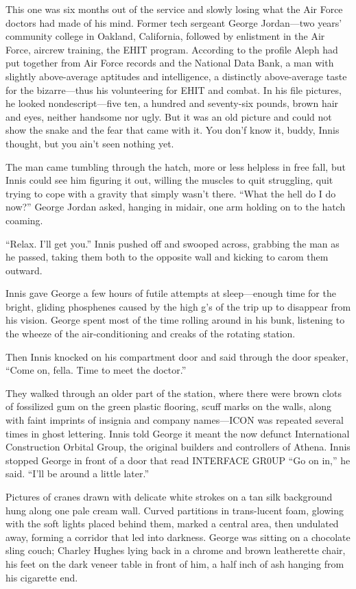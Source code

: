 This one was six months out of the service and slowly losing what the Air Force doctors had made of his mind. Former tech sergeant George Jordan—two years’ community college in Oakland, California, followed by enlistment in the Air Force, aircrew training, the EHIT program. According to the profile Aleph had put together from Air Force records and the National Data Bank, a man with slightly above-average aptitudes and intelligence, a distinctly above-average taste for the bizarre—thus his volunteering for EHIT and combat. In his file pictures, he looked nondescript—five ten, a hundred and seventy-six pounds, brown hair and eyes, neither handsome nor ugly. But it was an old picture and could not show the snake and the fear that came with it. You don’f know it, buddy, Innis thought, but you ain’t seen nothing yet.

The man came tumbling through the hatch, more or less helpless in free fall, but Innis could see him figuring it out, willing the muscles to quit struggling, quit trying to cope with a gravity that simply wasn’t there. “What the hell do I do now?” George Jordan asked, hanging in midair, one arm holding on to the hatch coaming.

``Relax. I’ll get you.'' Innis pushed off and swooped across, grabbing the man as he passed, taking them both to the opposite wall and kicking to carom them outward.

Innis gave George a few hours of futile attempts at sleep—enough time for the bright, gliding phosphenes caused by the high g’s of the trip up to disappear from his vision. George spent most of the time rolling around in his bunk, listening to the wheeze of the air-conditioning and creaks of the rotating station.

Then Innis knocked on his compartment door and said through the door speaker, ``Come on, fella. Time to meet the doctor.''

They walked through an older part of the station, where there were brown clots of fossilized gum on the green plastic flooring, scuff marks on the walls, along with faint imprints of insignia and company names—ICON was repeated several times in ghost lettering. Innis told George it meant the now defunct International Construction Orbital Group, the original builders and controllers of Athena. Innis stopped George in front of a door that read INTERFACE GR0UP “Go on in,” he said. “I’ll be around a little later.”

Pictures of cranes drawn with delicate white strokes on a tan silk background hung along one pale cream wall. Curved partitions in trans-lucent foam, glowing with the soft lights placed behind them, marked a central area, then undulated away, forming a corridor that led into darkness. George was sitting on a chocolate sling couch; Charley Hughes lying back in a chrome and brown leatherette chair, his feet on the dark veneer table in front of him, a half inch of ash hanging from his cigarette end.

